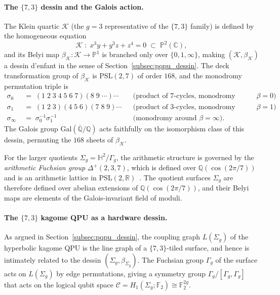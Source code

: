 \documentclass[11pt,oneside]{amsbook}
\numberwithin{equation}{section}
\theoremstyle{plain}
\theoremstyle{definition}
\theoremstyle{remark}
\begin{document}
\paragraph{The $\{7,3\}$ dessin and the Galois action.}
The Klein quartic $\mathcal{K}$ (the $g=3$ representative of the $\{7,3\}$
family) is defined by the homogeneous equation
\[
  \mathcal{K} \;:\; x^3 y + y^3 z + z^4 = 0
  \;\subset\; \mathbb{P}^2(\mathbb{C}),
\]
and its Belyi map $\beta_{\mathcal{K}}: \mathcal{K} \to \mathbb{P}^1$ is
branched only over $\{0, 1, \infty\}$, making $(\mathcal{K},
\beta_{\mathcal{K}})$ a dessin d'enfant in the sense of
Section~\ref{subsec:pqpu_dessin}.  The deck transformation group of
$\beta_{\mathcal{K}}$ is $\mathrm{PSL}(2,7)$ of order $168$, and the
monodromy permutation triple is
\begin{align*}
  \sigma_0 &\;=\; (1\;2\;3\;4\;5\;6\;7)(8\;9\;\cdots)\cdots
    &&\text{(product of 7-cycles, monodromy around $\beta=0$)},\\
  \sigma_1 &\;=\; (1\;2\;3)(4\;5\;6)(7\;8\;9)\cdots
    &&\text{(product of 3-cycles, monodromy around $\beta=1$)},\\
  \sigma_\infty &\;=\; \sigma_0^{-1}\sigma_1^{-1}
    &&\text{(monodromy around $\beta=\infty$)}.
\end{align*}
The Galois group $\mathrm{Gal}(\overline{\mathbb{Q}}/\mathbb{Q})$ acts
faithfully on the isomorphism class of this dessin, permuting the
$168$ sheets of $\beta_{\mathcal{K}}$.

For the larger quotients $\Sigma_g = \mathbb{H}^2/\Gamma_g$, the
arithmetic structure is governed by the \emph{arithmetic Fuchsian group}
$\Delta^+(2,3,7)$, which is defined over $\mathbb{Q}(\cos(2\pi/7))$ and
is an arithmetic lattice in $\mathrm{PSL}(2,\mathbb{R})$~\cite{VoightAFL2021}.
The quotient surfaces $\Sigma_g$ are therefore defined over abelian extensions
of $\mathbb{Q}(\cos(2\pi/7))$, and their Belyi maps are elements of the
Galois-invariant field of moduli.

\paragraph{The $\{7,3\}$ kagome QPU as a hardware dessin.}
As argued in Section~\ref{subsec:pqpu_dessin}, the coupling graph
$L(\Sigma_g)$ of the hyperbolic kagome QPU is the line graph of a
$\{7,3\}$-tiled surface, and hence is intimately related to the dessin
$(\Sigma_g, \beta_{\Sigma_g})$.  The Fuchsian group $\Gamma_g$ of the
surface acts on $L(\Sigma_g)$ by edge permutations, giving a symmetry group
$\Gamma_g/[\Gamma_g,\Gamma_g]$ that acts on the logical qubit space
$\mathcal{C} = H_1(\Sigma_g;\mathbb{F}_2) \cong \mathbb{F}_2^{2g}$.
\end{document}

